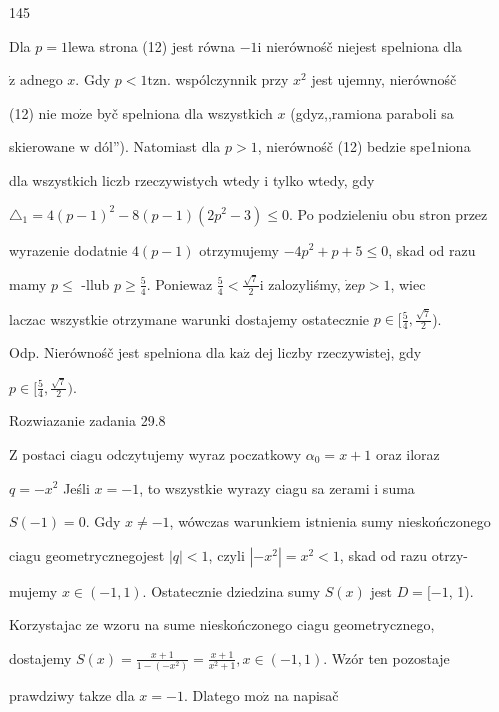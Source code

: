 \documentclass[a4paper,12pt]{article}
\begin{document}
145

Dla $p=1$lewa strona (12) jest równa $-1\mathrm{i}$ nierównośč niejest spelniona dla

$\dot{\mathrm{z}}$ adnego $x$. Gdy $p<1\mathrm{t}\mathrm{z}\mathrm{n}$. wspólczynnik przy $x^{2}$ jest ujemny, nierównośč

(12) nie $\mathrm{m}\mathrm{o}\dot{\mathrm{z}}\mathrm{e}$ byč spelniona dla wszystkich $x$ (gdyz,,ramiona paraboli sa

skierowane $\mathrm{w}$ dól''). Natomiast dla $p>1$, nierównośč (12) bedzie spe1niona

dla wszystkich liczb rzeczywistych wtedy $\mathrm{i}$ tylko wtedy, gdy

$\triangle_{1} =4(p-1)^{2}-8(p-1)(2p^{2}-3) \leq 0$. Po podzieleniu obu stron przez

wyrazenie dodatnie $4(p-1)$ otrzymujemy $-4p^{2}+p+5\leq 0$, skad od razu

mamy $ p\leq$ -llub $ p\geq \displaystyle \frac{5}{4}$. Poniewaz $\displaystyle \frac{5}{4}< \displaystyle \frac{\sqrt{7}}{2}\mathrm{i}$ zalozyliśmy, $\dot{\mathrm{z}}\mathrm{e}p>1$, wiec

laczac wszystkie otrzymane warunki dostajemy ostatecznie $ p\in [\displaystyle \frac{5}{4},\frac{\sqrt{7}}{2}$).

Odp. Nierównośč jest spelniona dla $\mathrm{k}\mathrm{a}\dot{\mathrm{z}}$ dej liczby rzeczywistej, gdy

$ p\in [\displaystyle \frac{5}{4},\frac{\sqrt{7}}{2}).$

Rozwiazanie zadania 29.8

$\mathrm{Z}$ postaci ciagu odczytujemy wyraz poczatkowy $\alpha_{0}=x+1$ oraz iloraz

$q = -x^{2}$ Jeśli $x = -1$, to wszystkie wyrazy ciagu sa zerami $\mathrm{i}$ suma

$S(-1)=0$. Gdy $x\neq-1$, wówczas warunkiem istnienia sumy nieskończonego

ciagu geometrycznegojest $|q|<1$, czyli $|-x^{2}|=x^{2}<1$, skad od razu otrzy-

mujemy $x\in(-1,1)$. Ostatecznie dziedzina sumy $S(x)$ jest $D=[-1$, 1).

Korzystajac ze wzoru na sume nieskończonego ciagu geometrycznego,

dostajemy $S(x) =\displaystyle \frac{x+1}{1-(-x^{2})}=\frac{x+1}{x^{2}+1},  x\in (-1,1)$. Wzór ten pozostaje

prawdziwy takze dla $x=-1$. Dlatego $\mathrm{m}\mathrm{o}\dot{\mathrm{z}}$ na napisač
\end{document}
